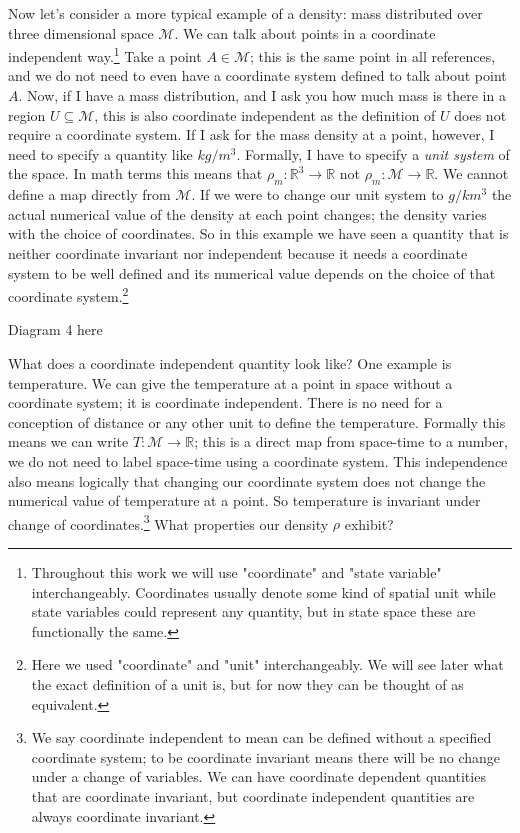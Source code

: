 \documentclass{article}
\begin{document}
	Now let's consider a more typical example of a density: mass distributed over three dimensional space $\mathcal{M}$. We can talk about points in a coordinate independent way.\footnote{Throughout this work we will use "coordinate" and "state variable" interchangeably. Coordinates usually denote some kind of spatial unit while state variables could represent any quantity, but in state space these are functionally the same.} Take a point $A \in \mathcal{M}$; this is the same point in all references, and we do not need to even have a coordinate system defined to talk about point $A$. Now, if I have a mass distribution, and I ask you how much mass is there in a region $U \subseteq \mathcal{M}$, this is also coordinate independent as the definition of $U$ does not require a coordinate system. If I ask for the mass density at a point, however, I need to specify a quantity like $kg/m^3$. Formally, I have to specify a \textit{unit system} of the space. In math terms this means that $\rho_m : \mathbb{R}^3 \to \mathbb{R}$ not $\rho_m : \mathcal{M} \to \mathbb{R}$. We cannot define a map directly from $\mathcal{M}$. If we were to change our unit system to $g/km^3$ the actual numerical value of the density at each point changes; the density varies with the choice of coordinates. So in this example we have seen a quantity that is neither coordinate invariant nor independent because it needs a coordinate system to be well defined and its numerical value depends on the choice of that coordinate system.\footnote{Here we used "coordinate" and "unit" interchangeably. We will see later what the exact definition of a unit is, but for now they can be thought of as equivalent.}
	
Diagram 4 here
	
	What does a coordinate independent quantity look like? One example is temperature. We can give the temperature at a point in space without a coordinate system; it is coordinate independent. There is no need for a conception of distance or any other unit to define the temperature. Formally this means we can write $T : \mathcal{M} \to \mathbb{R}$; this is a direct map from space-time to a number, we do not need to label space-time using a coordinate system. This independence also means logically that changing our coordinate system does not change the numerical value of temperature at a point. So temperature is invariant under change of coordinates.\footnote{We say coordinate independent to mean can be defined without a specified coordinate system; to be coordinate invariant means there will be no change under a change of variables. We can have coordinate dependent quantities that are coordinate invariant, but coordinate independent quantities are always coordinate invariant.} What properties our density $\rho$ exhibit?
	
\end{document}
